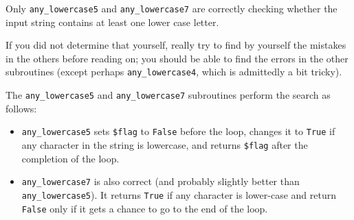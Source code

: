 Only \verb'any_lowercase5' and \verb'any_lowercase7' are correctly 
checking whether the input string contains at least one lower 
case letter.

If you did not determine that yourself, really try to find by 
yourself the mistakes in the others before reading on; you should be 
able to find the errors in the other subroutines (except 
perhaps \verb'any_lowercase4', which is admittedly a bit tricky).

The \verb'any_lowercase5' and \verb'any_lowercase7' subroutines 
perform the search as follows:

\begin{itemize} 
\item \verb'any_lowercase5' sets {\tt \$flag} 
to {\tt False} before the loop, changes it to {\tt True} if 
any character in the string is lowercase, and returns 
{\tt \$flag} after the completion of the loop.

\item  \verb'any_lowercase7' is also correct (and probably slightly 
better than \verb'any_lowercase5'). It returns {\tt True} if 
any character is lower-case and return {\tt False} only if 
it gets a chance to go to the end of the loop.
\end{itemize}

